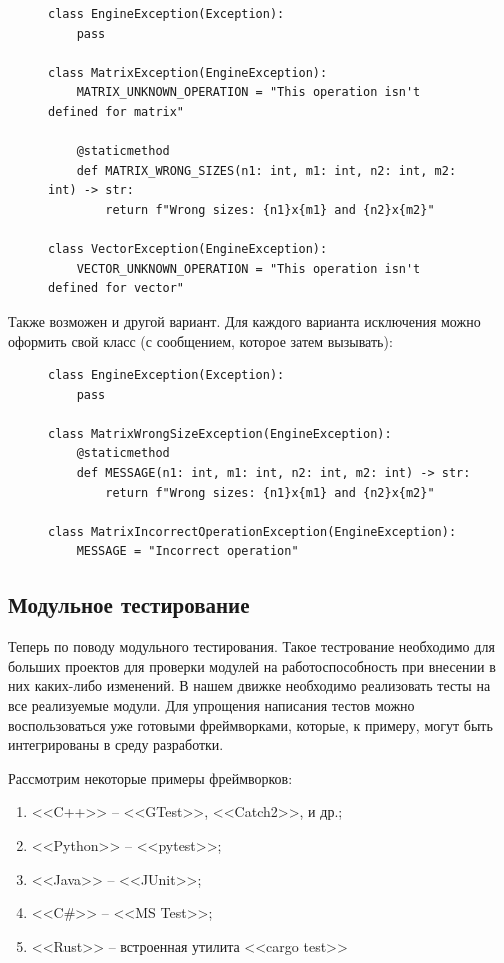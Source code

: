 	\begin{figure}[H]
\begin{lstlisting}[caption=<<Пример (Python)>>]
class EngineException(Exception):
	pass

class MatrixException(EngineException):
	MATRIX_UNKNOWN_OPERATION = "This operation isn't defined for matrix"

	@staticmethod
	def MATRIX_WRONG_SIZES(n1: int, m1: int, n2: int, m2: int) -> str:
		return f"Wrong sizes: {n1}x{m1} and {n2}x{m2}"

class VectorException(EngineException):
	VECTOR_UNKNOWN_OPERATION = "This operation isn't defined for vector"
\end{lstlisting}
	\end{figure}

	Также возможен и другой вариант. Для каждого варианта исключения можно оформить свой класс (с сообщением, которое затем вызывать):
	\begin{figure}[H]
\begin{lstlisting}[caption=<<Пример (Python)>>]
class EngineException(Exception):
	pass

class MatrixWrongSizeException(EngineException):
	@staticmethod
	def MESSAGE(n1: int, m1: int, n2: int, m2: int) -> str:
		return f"Wrong sizes: {n1}x{m1} and {n2}x{m2}"

class MatrixIncorrectOperationException(EngineException):
	MESSAGE = "Incorrect operation"
\end{lstlisting}
	\end{figure}


\subsection{Модульное тестирование}

	Теперь по поводу модульного тестирования. Такое тестрование необходимо для больших проектов для проверки модулей на работоспособность при внесении в них каких-либо изменений. В нашем движке необходимо реализовать тесты на все реализуемые модули. Для упрощения написания тестов можно воспользоваться уже готовыми фреймворками, которые, к примеру, могут быть интегрированы в среду разработки.

	Рассмотрим некоторые примеры фреймворков:
	\begin{enumerate}
		\item <<C++>> -- <<GTest>>, <<Catch2>>, и др.;
		\item <<Python>> -- <<pytest>>;
		\item <<Java>> -- <<JUnit>>;
		\item <<C\#>> -- <<MS Test>>;
		\item <<Rust>> -- встроенная утилита <<cargo test>>
	\end{enumerate}

